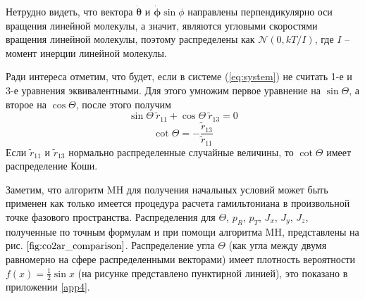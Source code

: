 Нетрудно видеть, что вектора $\dot{\boldsymbol{\theta}}$ и $\dot{\boldsymbol{\phi}} \sin \phi$ направлены перпендикулярно оси вращения линейной молекулы, а значит, являются угловыми скоростями вращения линейной молекулы, поэтому распределены как $\mathcal{N}(0,kT/I)$, где $I$ -- момент инерции линейной молекулы. \par
Ради интереса отметим, что будет, если в системе (\ref{eq:system}) не считать 1-е и 3-е уравнения эквивалентными. Для этого умножим первое уравнение на $\sin\Theta$, а второе на $\cos\Theta$, после этого получим
\[
\sin\Theta \: \tilde{r}_{11} + \cos\Theta \: \tilde{r}_{13} = 0
\]
\[
\cot\Theta = -\frac{\tilde{r}_{13}}{\tilde{r}_{11}}
\]
Если $\tilde{r}_{11}$ и $\tilde{r}_{13}$ нормально распределенные случайные величины, то $\cot\Theta$ имеет распределение Коши. \par
Заметим, что алгоритм MH для получения начальных условий может быть применен как только имеется процедура расчета гамильтониана в произвольной точке фазового пространства. Распределения для $\Theta$, $p_R$, $p_T$, $J_x$, $J_y$, $J_z$, полученные по точным формулам и при помощи алгоритма MH, представлены на рис. $\ref{fig:co2ar_comparison}$. Распределение угла $\Theta$ (как угла между двумя равномерно на сфере распределенными векторами) имеет плотность вероятности $f(x) = \displaystyle \frac{1}{2} \sin x$ (на рисунке представлено пунктирной линией), это показано в приложении \ref{app4}.


